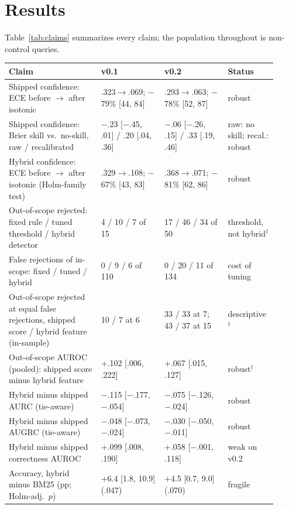 \section{Results}
\label{sec:results}

Table~\ref{tab:claims} summarizes every claim; the population throughout is non-control queries.

\begin{table}[t]
  \centering
  \small
  \setlength{\tabcolsep}{4pt}
  \begin{tabular}{@{}p{0.32\linewidth}p{0.225\linewidth}p{0.225\linewidth}p{0.14\linewidth}@{}}
    \toprule
    \textbf{Claim} & \textbf{v0.1} & \textbf{v0.2} & \textbf{Status} \\
    \midrule
    Shipped confidence: ECE before $\to$ after isotonic & .323$\to$.069; $-$79\% [44, 84] & .293$\to$.063; $-$78\% [52, 87] & robust \\
    Shipped confidence: Brier skill vs.\ no-skill, raw / recalibrated & $-$.23 [$-$.45, .01] / .20 [.04, .36] & $-$.06 [$-$.26, .15] / .33 [.19, .46] & raw: no skill; recal.: robust \\
    Hybrid confidence: ECE before $\to$ after isotonic (Holm-family test) & .329$\to$.108; $-$67\% [43, 83] & .368$\to$.071; $-$81\% [62, 86] & robust \\
    Out-of-scope rejected: fixed rule / tuned threshold / hybrid detector & 4 / 10 / 7 of 15 & 17 / 46 / 34 of 50 & threshold, not hybrid$^\dagger$ \\
    False rejections of in-scope: fixed / tuned / hybrid & 0 / 9 / 6 of 110 & 0 / 20 / 11 of 134 & cost of tuning \\
    Out-of-scope rejected at equal false rejections, shipped score / hybrid feature (in-sample) & 10 / 7 at 6 & 33 / 33 at 7; 43 / 37 at 15 & descriptive$^\dagger$ \\
    Out-of-scope AUROC (pooled): shipped score minus hybrid feature & +.102 [.006, .222] & +.067 [.015, .127] & robust$^\dagger$ \\
    Hybrid minus shipped AURC (tie-aware) & $-$.115 [$-$.177, $-$.054] & $-$.075 [$-$.126, $-$.024] & robust \\
    Hybrid minus shipped AUGRC (tie-aware) & $-$.048 [$-$.073, $-$.024] & $-$.030 [$-$.050, $-$.011] & robust \\
    Hybrid minus shipped correctness AUROC & +.099 [.008, .190] & +.058 [$-$.001, .118] & weak on v0.2 \\
    Accuracy, hybrid minus BM25 (pp; Holm-adj.\ $p$) & +6.4 [1.8, 10.9] (.047) & +4.5 [0.7, 9.0] (.070) & fragile \\

\end{tabular}
\end{table}
